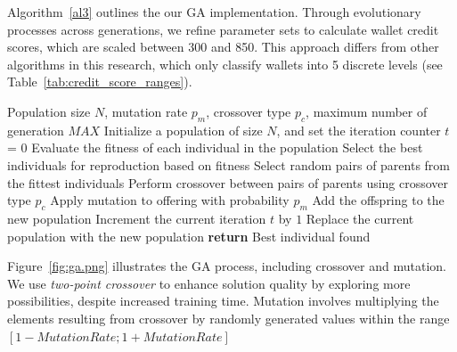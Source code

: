 \documentclass[runningheads]{llncs}
\begin{document}
{%
Algorithm~\ref{al3} outlines the our GA implementation. Through evolutionary processes across generations, we refine parameter sets to calculate wallet credit scores, which are scaled between 300 and 850. This approach differs from other algorithms in this research, which only classify wallets into 5 discrete levels (see Table~\ref{tab:credit_score_ranges}). 


\begin{algorithm}[H]
\caption{Genetic Algorithm}\label{al3}
\begin{algorithmic}[1]
\Require Population size $N$, mutation rate $p_m$, crossover type $p_c$, maximum number of generation $MAX$
\State Initialize a population of size $N$, and set the iteration counter $t$ = 0
    \State Evaluate the fitness of each individual in the population
    \State Select the best individuals for reproduction based on fitness 
        \State Select random pairs of parents from the fittest individuals
        \State Perform crossover between pairs of parents using crossover type $p_c$
        \State Apply mutation to offering with probability $p_m$
        \State Add the offspring to the new population
    \EndWhile
    \State Increment the current iteration $t$ by $1$
    \State Replace the current population with the new population
\EndFor
\State \textbf{return} Best individual found
\end{algorithmic}
\end{algorithm}

Figure~\ref{fig:ga.png} illustrates the GA process, including crossover and mutation. We use \textit{two-point crossover} to enhance solution quality by exploring more possibilities, despite increased training time. Mutation involves multiplying the elements resulting from crossover by randomly generated values within the range $[1 - Mutation Rate; 1 + Mutation Rate]$


}
\end{document}
